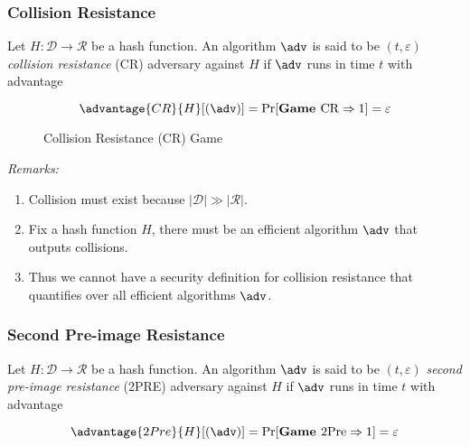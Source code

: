 \documentclass[11pt,a4paper]{article}
\begin{document}
\subsubsection{Collision Resistance} Let $H: \mathcal{D} \rightarrow \mathcal{R}$ be a hash function. An algorithm $\adv$ is said to be $(t,\varepsilon)$ \textit{collision resistance} (CR) adversary against $H$ if $\adv$ runs in time $t$ with advantage

$$
\advantage{CR}{H}[(\adv)] = \Pr[\textbf{Game } \text{CR} \Rightarrow 1] = \varepsilon
$$ 

\begin{figure}[H]
\begin{pchstack}[ center , boxed, space=0.5cm]
\end{pchstack}
\caption{Collision Resistance (CR) Game}
\label{fig:cr-game}
\end{figure}

\bigskip
\textit{Remarks:}
\begin{enumerate}
	\item Collision must exist because $|\mathcal{D}| \gg |\mathcal{R}|$.
	\item Fix a hash function $H$, there must be an efficient algorithm $\adv$ that outputs collisions. 
	\item Thus we cannot have a security definition for collision resistance that quantifies over all efficient algorithms $\adv$. 
\end{enumerate}


\subsubsection{Second Pre-image Resistance}
Let $H: \mathcal{D} \rightarrow \mathcal{R}$ be a hash function. An algorithm $\adv$ is said to be $(t,\varepsilon)$ \textit{second pre-image resistance} (2PRE) adversary against $H$ if $\adv$ runs in time $t$ with advantage  

$$
\advantage{2Pre}{H}[(\adv)] = \Pr[\textbf{Game } \text{2Pre} \Rightarrow 1] = \varepsilon
$$ 
\end{document}
